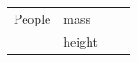 {{\begin{center}
\begin{xtabular}[t]{|l|l|l|l|}
        People &
    
    
        mass &
    
    
         &
    
    
     \tabularnewline{}
    
    
         &
    
    
        height &
    
    
         &
    
    
     \tabularnewline{}
    
    

\end{xtabular}
\end{center}}}
